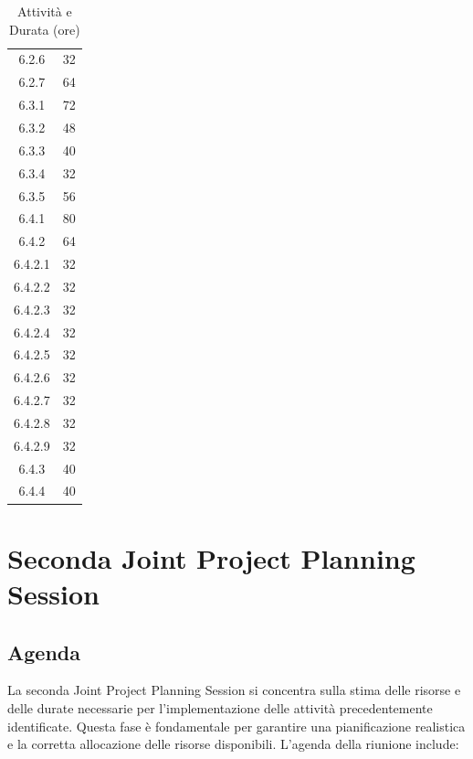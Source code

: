 \begin{table}[H]
\begin{tabular}{|c|c|}
        6.2.6             & 32                    \\
        6.2.7             & 64                    \\
        6.3.1             & 72                    \\
        6.3.2             & 48                    \\
        6.3.3             & 40                    \\
        6.3.4             & 32                    \\
        6.3.5             & 56                    \\
        6.4.1             & 80                    \\
        6.4.2             & 64                    \\
        6.4.2.1           & 32                    \\
        6.4.2.2           & 32                    \\
        6.4.2.3           & 32                    \\
        6.4.2.4           & 32                    \\
        6.4.2.5           & 32                    \\
        6.4.2.6           & 32                    \\
        6.4.2.7           & 32                    \\
        6.4.2.8           & 32                    \\
        6.4.2.9           & 32                    \\
        6.4.3             & 40                    \\
        6.4.4             & 40                    \\
        \hline
    \end{tabular}
    \caption{Attività e Durata (ore)}
    \label{tab:attivita-durata}
\end{table}

\section{Seconda Joint Project Planning Session}

\subsection{Agenda}

La seconda Joint Project Planning Session si concentra sulla stima delle risorse e delle durate necessarie per l'implementazione delle attività precedentemente identificate. Questa fase è fondamentale per garantire una pianificazione realistica e la corretta allocazione delle risorse disponibili. L'agenda della riunione include:

